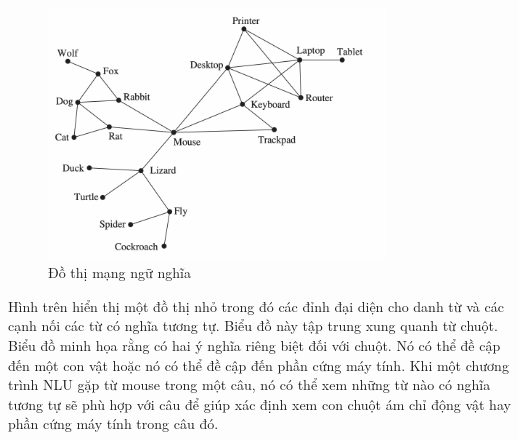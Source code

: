 \begin{figure}[H] %
    \centering %
    \includegraphics[width=0.8\textwidth]{assets/dothi_mangngunghia.png} 
    \caption{Đồ thị mạng ngữ nghĩa} %
\end{figure}
Hình trên hiển thị một đồ thị nhỏ trong đó các đỉnh đại diện cho danh từ và các cạnh nối các từ có nghĩa tương tự. Biểu đồ này tập trung xung quanh từ chuột. Biểu đồ minh họa rằng có hai ý nghĩa riêng biệt đối với chuột. Nó có thể đề cập đến một con vật hoặc nó có thể đề cập đến phần cứng máy tính. Khi một chương trình NLU gặp từ mouse trong một câu, nó có thể xem những từ nào có nghĩa tương tự sẽ phù hợp với câu để giúp xác định xem con chuột ám chỉ động vật hay phần cứng máy tính trong câu đó.\\


